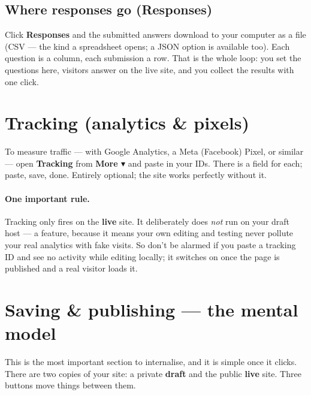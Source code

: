 \documentclass[11pt]{article}
\begin{document}
\subsection{Where responses go (Responses)}

Click \textbf{Responses} and the submitted answers download to your computer as a file
(CSV --- the kind a spreadsheet opens; a JSON option is available too). Each question
is a column, each submission a row. That is the whole loop: you set the questions here,
visitors answer on the live site, and you collect the results with one click.

\section{Tracking (analytics \& pixels)}

To measure traffic --- with Google Analytics, a Meta (Facebook) Pixel, or similar ---
open \textbf{Tracking} from \textbf{More $\blacktriangledown$} and paste in your IDs. There is a field for
each; paste, save, done. Entirely optional; the site works perfectly without it.

\paragraph{One important rule.} Tracking only fires on the \textbf{live} site. It
deliberately does \emph{not} run on your draft host --- a feature, because it means
your own editing and testing never pollute your real analytics with fake visits. So
don't be alarmed if you paste a tracking ID and see no activity while editing locally;
it switches on once the page is published and a real visitor loads it.

\section{Saving \& publishing --- the mental model}

This is the most important section to internalise, and it is simple once it clicks.
There are two copies of your site: a private \textbf{draft} and the public
\textbf{live} site. Three buttons move things between them.
\end{document}
